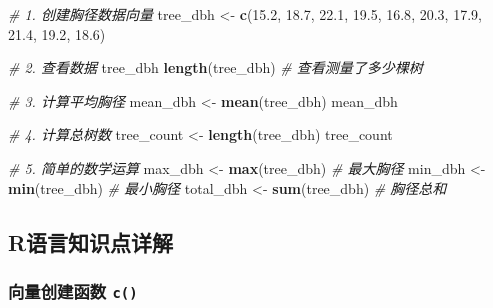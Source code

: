 \documentclass[
]{book}
\newenvironment{Shaded}{\begin{snugshade}}{\end{snugshade}}
\newcommand{\CommentTok}[1]{\textcolor[rgb]{0.56,0.35,0.01}{\textit{#1}}}
\newcommand{\FloatTok}[1]{\textcolor[rgb]{0.00,0.00,0.81}{#1}}
\newcommand{\FunctionTok}[1]{\textcolor[rgb]{0.13,0.29,0.53}{\textbf{#1}}}
\newcommand{\NormalTok}[1]{#1}
\newcommand{\OtherTok}[1]{\textcolor[rgb]{0.56,0.35,0.01}{#1}}
\begin{document}
\begin{Shaded}
\begin{Highlighting}[]
\CommentTok{\# 1. 创建胸径数据向量}
\NormalTok{tree\_dbh }\OtherTok{\textless{}{-}} \FunctionTok{c}\NormalTok{(}\FloatTok{15.2}\NormalTok{, }\FloatTok{18.7}\NormalTok{, }\FloatTok{22.1}\NormalTok{, }\FloatTok{19.5}\NormalTok{, }\FloatTok{16.8}\NormalTok{, }\FloatTok{20.3}\NormalTok{, }\FloatTok{17.9}\NormalTok{, }\FloatTok{21.4}\NormalTok{, }\FloatTok{19.2}\NormalTok{, }\FloatTok{18.6}\NormalTok{)}

\CommentTok{\# 2. 查看数据}
\NormalTok{tree\_dbh}
\FunctionTok{length}\NormalTok{(tree\_dbh)  }\CommentTok{\# 查看测量了多少棵树}

\CommentTok{\# 3. 计算平均胸径}
\NormalTok{mean\_dbh }\OtherTok{\textless{}{-}} \FunctionTok{mean}\NormalTok{(tree\_dbh)}
\NormalTok{mean\_dbh}

\CommentTok{\# 4. 计算总树数}
\NormalTok{tree\_count }\OtherTok{\textless{}{-}} \FunctionTok{length}\NormalTok{(tree\_dbh)}
\NormalTok{tree\_count}

\CommentTok{\# 5. 简单的数学运算}
\NormalTok{max\_dbh }\OtherTok{\textless{}{-}} \FunctionTok{max}\NormalTok{(tree\_dbh)  }\CommentTok{\# 最大胸径}
\NormalTok{min\_dbh }\OtherTok{\textless{}{-}} \FunctionTok{min}\NormalTok{(tree\_dbh)  }\CommentTok{\# 最小胸径}
\NormalTok{total\_dbh }\OtherTok{\textless{}{-}} \FunctionTok{sum}\NormalTok{(tree\_dbh)  }\CommentTok{\# 胸径总和}
\end{Highlighting}
\end{Shaded}

\hypertarget{rux8bedux8a00ux77e5ux8bc6ux70b9ux8be6ux89e3}{%
\subsection{R语言知识点详解}\label{rux8bedux8a00ux77e5ux8bc6ux70b9ux8be6ux89e3}}

\hypertarget{ux5411ux91cfux521bux5efaux51fdux6570-c}{%
\subsubsection{\texorpdfstring{向量创建函数 \texttt{c()}}{向量创建函数 c()}}\label{ux5411ux91cfux521bux5efaux51fdux6570-c}}
\end{document}
